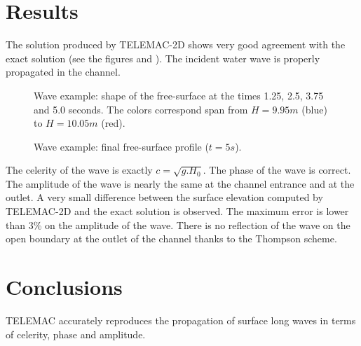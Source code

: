 \section{Results}
The solution produced by TELEMAC-2D shows very good agreement with
the exact solution (see the figures \label{fig:wave1} and \label{fig:wave2}).
The incident water wave is properly propagated in the channel.

\begin{figure}\label{fig:wave1}
    \caption{Wave example: shape of the free-surface at the times 1.25, 2.5, 3.75 and 5.0 seconds. The colors correspond span
    from $H = 9.95m$ (blue) to $H = 10.05m$ (red).}
\end{figure}
\begin{figure}\label{fig:wave2}
    \caption{Wave example: final free-surface profile ($t=5s$).}
\end{figure}

The celerity of the wave is exactly $c = \sqrt{g.H_0}$.
The phase of the wave is correct. The amplitude of the wave is nearly
the same at the channel entrance and at the outlet. A very small
difference between the surface elevation computed by TELEMAC-2D
and the exact solution is observed. The maximum error is lower
than 3\% on the amplitude of the wave.
There is no reflection of the wave on the open boundary at the outlet
of the channel thanks to the Thompson scheme.
\section{Conclusions}
TELEMAC accurately reproduces the propagation of surface long waves in terms of celerity,
phase and amplitude.
